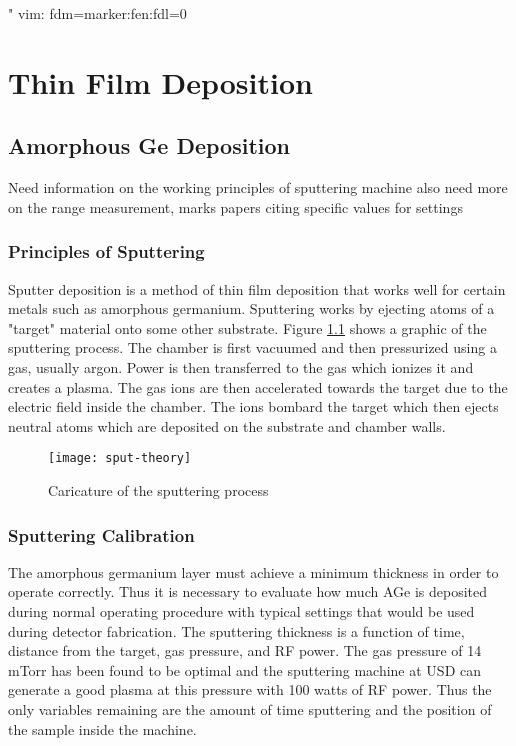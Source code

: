 " vim: fdm=marker:fen:fdl=0
\chapter{Thin Film Deposition}
\section{Amorphous Ge Deposition}

Need information on the working principles of sputtering machine
also need more on the range measurement, marks papers citing specific values for settings
\subsection{Principles of Sputtering}
Sputter deposition is a method of thin film deposition that works well for certain metals such as amorphous germanium.
Sputtering works by ejecting atoms of a "target" material onto some other substrate.
Figure \ref{fig:sput-theory} shows a graphic of the sputtering process.
The chamber is first vacuumed and then pressurized using a gas, usually argon.
Power is then transferred to the gas which ionizes it and creates a plasma.
The gas ions are then accelerated towards the target due to the electric field inside the chamber.
The ions bombard the target which then ejects neutral atoms which are deposited on the substrate and chamber walls.

\begin{figure}[htpb]
\centering
\texttt{[image: sput-theory]}
\caption{Caricature of the sputtering process}
\label{fig:sput-theory}
\end{figure}

\subsection{Sputtering Calibration}
The amorphous germanium layer must achieve a minimum thickness in order to operate correctly.
Thus it is necessary to evaluate how much AGe is deposited during normal operating procedure with typical settings that would be used during detector fabrication.
The sputtering thickness is a function of time, distance from the target, gas pressure, and RF power.
The gas pressure of 14 mTorr has been found to be optimal and the sputtering machine at USD can generate a good plasma at this pressure with 100 watts of RF power.
Thus the only variables remaining are the amount of time sputtering and the position of the sample inside the machine.

